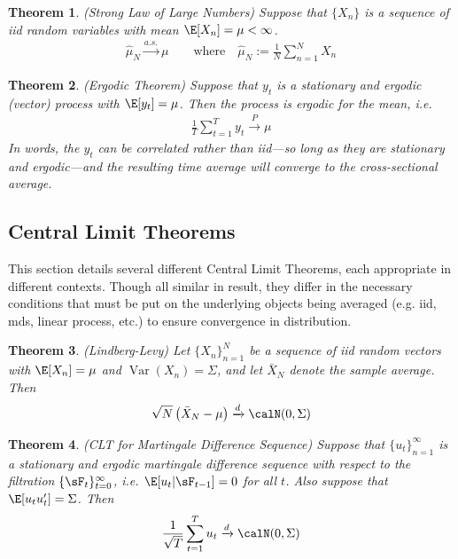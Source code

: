 \documentclass[12pt]{article}
\theoremstyle{plain}
\newtheorem{thm}{Theorem}[section]
\theoremstyle{definition}
\theoremstyle{remark}
\newcommand{\Var}{\operatorname{Var}}
\newcommand{\asto}{\xrightarrow{a.s.}}
\newcommand{\pto}{\xrightarrow{P}}
\newcommand{\dto}{\xrightarrow{d}}
\newcommand{\sumnN}{\sum^N_{n=1}}
\newcommand{\sumtT}{\sum^T_{t=1}}
\newcommand{\ninf}{_{n=1}^\infty}
\newcommand{\nN}{_{n=1}^N}
\newcommand{\tinfz}{_{t=0}^\infty}
\begin{document}
\begin{thm}\emph{(Strong Law of Large Numbers)}
Suppose that $\{X_n\}$ is a sequence of iid random variables with mean
$\E[X_n]=\mu<\infty$.
\begin{align*}
  \hat{\mu}_N \asto \mu
  \qquad\text{where} \quad
  \hat{\mu}_N := \frac{1}{N} \sumnN X_n
\end{align*}
\end{thm}

\begin{thm}\emph{(Ergodic Theorem)}
\label{thm:ergodic}
Suppose that $y_t$ is a stationary and ergodic (vector) process with
$\E[y_t]=\mu$. Then the process is ergodic for the mean, i.e.
\begin{align*}
  \frac{1}{T}\sumtT y_t \pto \mu
\end{align*}
In words, the $y_t$ can be correlated rather than iid---so long as they
are stationary and ergodic---and the resulting time average will
converge to the cross-sectional average.
\end{thm}


\clearpage
\subsection{Central Limit Theorems}

This section details several different Central Limit Theorems,
each appropriate in different contexts.
Though all similar in result, they differ in the necessary conditions
that must be put on the underlying objects being averaged (e.g. iid,
mds, linear process, etc.) to ensure convergence in distribution.

\begin{thm}\emph{(Lindberg-Levy)}
\label{thm:cltlindberglevy}
Let $\{X_n\}\nN$ be a sequence of iid random vectors with
$\E[X_n] = \mu$ and $\Var(X_n)=\Sigma$, and let $\bar{X}_N$ denote the
sample average. Then
\begin{align*}
  \sqrt{N}
  \left(\bar{X}_N - \mu\right) \dto \calN(0,\Sigma)
\end{align*}
\end{thm}

\begin{thm}\emph{(CLT for Martingale Difference Sequence)}
\label{thm:cltmds}
Suppose that $\{u_t\}\ninf$ is a stationary and ergodic martingale
difference sequence with respect to the filtration
$\{\sF_t\}\tinfz$, i.e. $\E[u_t|\sF_{t-1}]=0$ for all $t$.
Also suppose that $\E[u_tu_t']=\Sigma$. Then
\begin{align*}
  \frac{1}{\sqrt{T}}\sumtT u_t \dto \calN(0,\Sigma)
\end{align*}
\end{thm}
\end{document}
